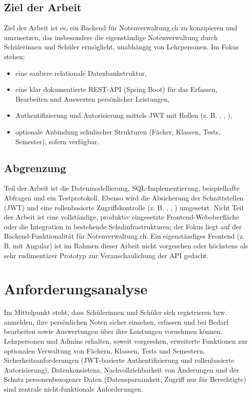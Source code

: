 \documentclass[12pt,a4paper]{article}
\newcommand{\code}[1]{\texttt{\detokenize{#1}}}
\begin{document}
    \subsection{Ziel der Arbeit}
    Ziel der Arbeit ist es, ein Backend für Notenverwaltung.ch zu konzipieren und umzusetzen,
    das insbesondere die eigenständige Notenverwaltung durch Schülerinnen und Schüler ermöglicht, unabhängig von Lehrpersonen. Im Fokus stehen:
    \begin{itemize}
        \item eine saubere relationale Datenbankstruktur,
        \item eine klar dokumentierte REST-API (Spring Boot) für das Erfassen, Bearbeiten und Auswerten persönlicher Leistungen,
        \item Authentifizierung und Autorisierung mittels JWT mit Rollen (z. B. \code{STUDENT}, \code{TEACHER}, \code{ADMIN}),
        \item optionale Anbindung schulischer Strukturen (Fächer, Klassen, Tests, Semester), sofern verfügbar.
    \end{itemize}

    \subsection{Abgrenzung}
    Teil der Arbeit ist die Datenmodellierung, SQL-Implementierung, beispielhafte Abfragen und ein Testprotokoll.
    Ebenso wird die Absicherung der Schnittstellen (JWT) und eine rollenbasierte Zugriffskontrolle
    (z. B. \code{STUDENT}, \code{TEACHER}, \code{ADMIN}) umgesetzt. Nicht Teil der Arbeit ist eine vollständige,
    produktiv eingesetzte Frontend-Weboberfläche oder die Integration in bestehende Schulinfrastrukturen; der Fokus
    liegt auf der Backend-Funktionalität für Notenverwaltung.ch. Ein eigenständiges Frontend (z. B. mit Angular) ist
    im Rahmen dieser Arbeit nicht vorgesehen oder höchstens als sehr rudimentärer Prototyp zur Veranschaulichung der API gedacht.

    \section{Anforderungsanalyse}
    Im Mittelpunkt steht, dass Schülerinnen und Schüler sich registrieren bzw. anmelden, ihre persönlichen Noten sicher einsehen,
    erfassen und bei Bedarf bearbeiten sowie Auswertungen über ihre Leistungen vornehmen können.
    Lehrpersonen und Admins erhalten, soweit vorgesehen, erweiterte Funktionen zur optionalen Verwaltung von Fächern, Klassen, Tests und Semestern.
    Sicherheitsanforderungen (JWT-basierte Authentifizierung und rollenbasierte Autorisierung), Datenkonsistenz, Nachvollziehbarkeit von Änderungen
    und der Schutz personenbezogener Daten (Datensparsamkeit, Zugriff nur für Berechtigte) sind zentrale nicht‑funktionale Anforderungen.
\end{document}
